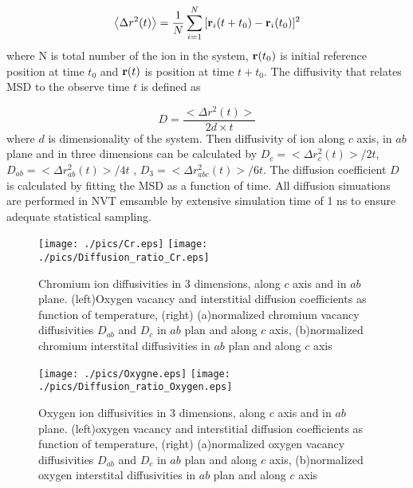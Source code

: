 \documentclass[twocolumn,showpacs,preprintnumbers,amsmath,amssymb,superscriptaddress,prb]{revtex4}
\begin{document}
\begin{equation}
	\big<\Delta{r}^2(t)\big> = \frac{1}{N} \sum_{i=1}^{N}{[\bold{r}_i(t+t_0) - \bold{r}_i(t_0)]^2}
\end{equation}
where N is total number of the ion in the system, $\bold{r}(t_0)$ is initial reference position at time $t_0$ and $\bold{r}(t)$ is position at time $t+t_0$. The diffusivity that relates MSD to the observe time $t$ is defined as  

\begin{equation}
D = \frac{\big<\Delta{r}^2(t)\big>}{2d\times t} 
\end{equation} 
where $d$ is dimensionality of the system. Then diffusivity of ion along $c$ axis, in $ab$ plane and in three dimensions can be calculated by $D_{c} = \big<\Delta{r}_c^2(t)\big>/2t$, $D_{ab} = \big<\Delta{r}_{ab}^2(t)\big>/4t$ , $D_{3} = \big<\Delta{r}_{abc}^2(t)\big>/6t$.  The diffusion coefficient $D$ is calculated by fitting the MSD as a function of time. All diffusion simuations are performed in NVT emsamble by extensive simulation time of 1 ns to ensure adequate statistical sampling.   

\begin{figure} 
	\centering
		\texttt{[image: ./pics/Cr.eps]}
		\texttt{[image: ./pics/Diffusion\_ratio\_Cr.eps]}
	\caption{Chromium ion diffusivities in 3 dimensions, along $c$ axis and in $ab$ plane.  (left)Oxygen vacancy and interstitial diffusion coefficients as function of temperature, (right) (a)normalized chromium vacancy diffusivities $D_{ab}$ and $D_{c}$ in $ab$ plan and along $c$ axis, (b)normalized chromium interstital diffusivities in $ab$ plan and along $c$ axis}
	\label{fig1} 
\end{figure}

\begin{figure} 
	\centering
		\texttt{[image: ./pics/Oxygne.eps]} 
		\texttt{[image: ./pics/Diffusion\_ratio\_Oxygen.eps]}
	\caption{Oxygen ion diffusivities in 3 dimensions, along $c$ axis and in $ab$ plane.  (left)oxygen vacancy and interstitial diffusion coefficients as function of temperature, (right) (a)normalized oxygen vacancy diffusivities $D_{ab}$ and $D_{c}$ in $ab$ plan and along $c$ axis, (b)normalized oxygen interstital diffusivities in $ab$ plan and along $c$ axis} 
	\label{fig2} 
\end{figure}


\end{document}
